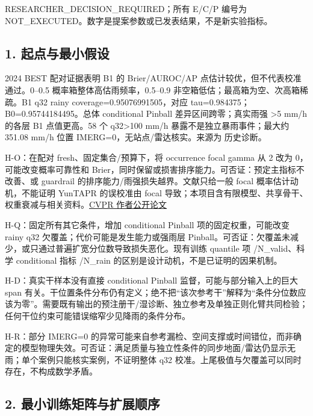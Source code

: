 \documentclass[UTF8,fontset=fandol,10pt]{ctexart}
\begin{document}
RESEARCHER\_\allowbreak{}DECISION\_\allowbreak{}REQUIRED；所有 E/\allowbreak{}C/\allowbreak{}P 编号为 NOT\_\allowbreak{}EXECUTED。数字是提案参数或已发表结果，不是新实验指标。

\subsection{1. 起点与最小假设}

2024 BEST 配对证据表明 B1 的 Brier/\allowbreak{}AUROC/\allowbreak{}AP 点估计较优，但不代表校准通过。0–0.5 概率箱整体高估雨频率，0.5–0.9 非空箱低估；最高箱为空、次高箱稀疏。B1 q32 rainy coverage=0.95076991505，对应 tau=0.984375；B0=0.95744184495。总体 conditional Pinball 差异区间跨零；真实雨强 >5 mm/\allowbreak{}h 的各层 B1 点值更高。58 个 q32>100 mm/\allowbreak{}h 暴露不是独立暴雨事件；最大约 351.08 mm/\allowbreak{}h 位置 IMERG=0，无站点/\allowbreak{}雷达核实。来源为 历史诊断。

H-O：在配对 fresh、固定集合/\allowbreak{}预算下，将 occurrence focal gamma 从 2 改为 0，可能改变概率可靠性和 Brier，同时保留或损害排序能力。可否证：预定主指标不改善、或 guardrail 的排序能力/\allowbreak{}雨强损失越界。文献只给一般 focal 概率估计动机，不能证明 YunTAPR 的误校准由 focal 导致；本项目含有限模型、共享骨干、权重衰减与相关资料。\href{https://openaccess.thecvf.com/content/CVPR2021/papers/Charoenphakdee_On_Focal_Loss_for_Class-Posterior_Probability_Estimation_A_Theoretical_Perspective_CVPR_2021_paper.pdf}{CVPR 作者公开论文}

H-Q：固定所有其它条件，增加 conditional Pinball 项的固定权重，可能改变 rainy q32 欠覆盖；代价可能是发生能力或强雨层 Pinball。可否证：欠覆盖未减少，或只通过普遍扩宽分位数导致损失恶化。现有训练 quantile 项 /\allowbreak{}N\_\allowbreak{}valid、科学 conditional 指标 /\allowbreak{}N\_\allowbreak{}rain 的区别是设计动机，不是已证明的因果机制。

H-D：真实干样本没有直接 conditional Pinball 监督，可能与部分输入上的巨大 span 有关。干位置条件分布仍有定义；绝不把“该次参考干”解释为“条件分位数应该为零”。需要既有输出的预注册干/\allowbreak{}湿诊断、独立参考及单独正则化臂共同检验；任何干位约束可能错误缩窄少见降雨的条件分布。

H-R：部分 IMERG=0 的异常可能来自参考漏检、空间支撑或时间错位，而非确定的模型物理失效。可否证：满足质量与独立性条件的同步地面/\allowbreak{}雷达仍显示无雨；单个案例只能核实案例，不证明整体 q32 校准。上尾极值与欠覆盖可以同时存在，不构成数学矛盾。

\subsection{2. 最小训练矩阵与扩展顺序}
\end{document}
